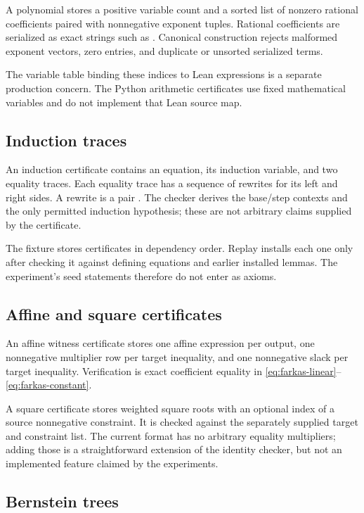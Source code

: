 A polynomial stores a positive variable count and a sorted list of nonzero
rational coefficients paired with nonnegative exponent tuples. Rational
coefficients are serialized as exact strings such as . Canonical
construction rejects malformed exponent vectors, zero entries, and duplicate
or unsorted serialized terms.

The variable table binding these indices to Lean expressions is a separate
production concern. The Python arithmetic certificates use fixed mathematical
variables and do not implement that Lean source map.

\subsection{Induction traces}

An induction certificate contains an equation, its induction variable, and
two equality traces. Each equality trace has a sequence of rewrites for its
left and right sides. A rewrite is a pair .
The checker derives the base/step contexts and the only permitted induction
hypothesis; these are not arbitrary claims supplied by the certificate.

The fixture stores certificates in dependency order. Replay installs each
one only after checking it against defining equations and earlier installed
lemmas. The experiment's seed statements therefore do not enter as axioms.

\subsection{Affine and square certificates}

An affine witness certificate stores one affine expression per output,
one nonnegative multiplier row per target inequality, and one nonnegative
slack per target inequality. Verification is exact coefficient equality in
\eqref{eq:farkas-linear}--\eqref{eq:farkas-constant}.

A square certificate stores weighted square roots with an optional index of
a source nonnegative constraint. It is checked against the separately supplied
target and constraint list. The current format has no arbitrary equality
multipliers; adding those is a straightforward extension of the identity
checker, but not an implemented feature claimed by the experiments.

\subsection{Bernstein trees}


